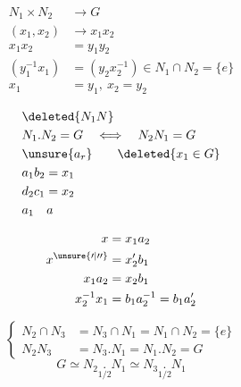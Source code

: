 \[
\begin{aligned}
N_1\times N_2&\longrightarrow G\\
(x_1,x_2)&\longrightarrow x_1x_2\\
x_1x_2&=y_1y_2\\
(y_1^{-1}x_1)&=(y_2x_2^{-1})\in N_1\cap N_2=\{e\}\\
x_1&=y_1,\ x_2=y_2
\end{aligned}
\]

\[
\begin{aligned}
&\deleted{N_1N}\\
&N_1.N_2=G\quad\Longleftrightarrow\quad N_2N_1=G\\
&\unsure{a_r}\qquad \deleted{x_1\in G}\\
&a_1b_2=x_1\\&d_2c_1=x_2\\&a_{1} \quad a
\end{aligned}
\]



\[
\begin{aligned}
x&=x_1a_2\\x^{\unsure{\prime|\prime\prime}}&=x'_2b_1\\
x_1a_2&=x_2b_1\\
x_2^{-1}x_1&=b_1a_2^{-1}=b_1a'_2
\end{aligned}
\]

\[
\left\{\begin{aligned}
N_2\cap N_3&=N_3\cap N_1=N_1\cap N_2=\{e\}\\
N_2N_3&=N_3.N_1=N_1.N_2=G
\end{aligned}\right.
\]
\[G\simeq N_2\mathbin{\underset{1/2}{.}}N_1\simeq N_3\mathbin{\underset{1/2}{.}}N_1\]

